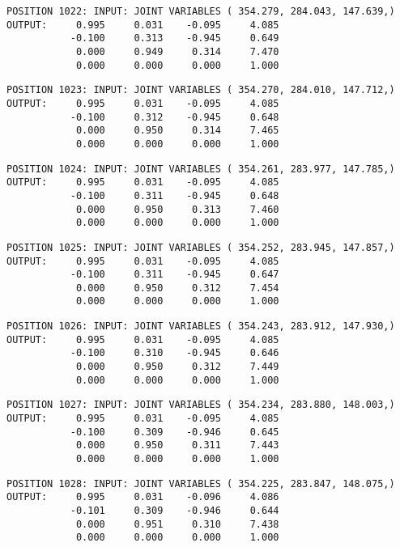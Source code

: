 \begin{verbatim}
POSITION 1022: INPUT: JOINT VARIABLES ( 354.279, 284.043, 147.639,)
OUTPUT:     0.995     0.031    -0.095     4.085
           -0.100     0.313    -0.945     0.649
            0.000     0.949     0.314     7.470
            0.000     0.000     0.000     1.000
\end{verbatim} \pagebreak[1]\begin{verbatim}
POSITION 1023: INPUT: JOINT VARIABLES ( 354.270, 284.010, 147.712,)
OUTPUT:     0.995     0.031    -0.095     4.085
           -0.100     0.312    -0.945     0.648
            0.000     0.950     0.314     7.465
            0.000     0.000     0.000     1.000
\end{verbatim} \pagebreak[1]\begin{verbatim}
POSITION 1024: INPUT: JOINT VARIABLES ( 354.261, 283.977, 147.785,)
OUTPUT:     0.995     0.031    -0.095     4.085
           -0.100     0.311    -0.945     0.648
            0.000     0.950     0.313     7.460
            0.000     0.000     0.000     1.000
\end{verbatim} \pagebreak[1]\begin{verbatim}
POSITION 1025: INPUT: JOINT VARIABLES ( 354.252, 283.945, 147.857,)
OUTPUT:     0.995     0.031    -0.095     4.085
           -0.100     0.311    -0.945     0.647
            0.000     0.950     0.312     7.454
            0.000     0.000     0.000     1.000
\end{verbatim} \pagebreak[1]\begin{verbatim}
POSITION 1026: INPUT: JOINT VARIABLES ( 354.243, 283.912, 147.930,)
OUTPUT:     0.995     0.031    -0.095     4.085
           -0.100     0.310    -0.945     0.646
            0.000     0.950     0.312     7.449
            0.000     0.000     0.000     1.000
\end{verbatim} \pagebreak[1]\begin{verbatim}
POSITION 1027: INPUT: JOINT VARIABLES ( 354.234, 283.880, 148.003,)
OUTPUT:     0.995     0.031    -0.095     4.085
           -0.100     0.309    -0.946     0.645
            0.000     0.950     0.311     7.443
            0.000     0.000     0.000     1.000
\end{verbatim} \pagebreak[1]\begin{verbatim}
POSITION 1028: INPUT: JOINT VARIABLES ( 354.225, 283.847, 148.075,)
OUTPUT:     0.995     0.031    -0.096     4.086
           -0.101     0.309    -0.946     0.644
            0.000     0.951     0.310     7.438
            0.000     0.000     0.000     1.000
\end{verbatim} \pagebreak[1]\begin{verbatim}

\end{verbatim}
